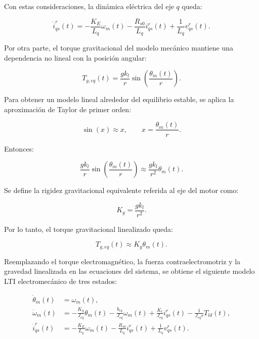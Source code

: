 \documentclass[10pt,a4paper]{article}
\begin{document}
Con estas consideraciones, la dinámica eléctrica del eje $q$ queda:

\begin{equation*}
	\dot{i}_{qs}^r(t)
	=
	-\frac{K_E}{L_q}\omega_m(t)
	-\frac{R_{s0}}{L_q}i_{qs}^r(t)
	+\frac{1}{L_q}v_{qs}^r(t).
\end{equation*}

Por otra parte, el torque gravitacional del modelo mecánico mantiene una dependencia no lineal con la posición angular:

\begin{equation*}
	T_{g,eq}(t)
	=
	\frac{gk_l}{r}
	\sin\left(\frac{\theta_m(t)}{r}\right).
\end{equation*}

Para obtener un modelo lineal alrededor del equilibrio estable, se aplica la aproximación de Taylor de primer orden:

\begin{equation*}
	\sin(x)\approx x,
	\qquad
	x=\frac{\theta_m(t)}{r}.
\end{equation*}

Entonces:

\begin{equation*}
	\frac{gk_l}{r}
	\sin\left(\frac{\theta_m(t)}{r}\right)
	\approx
	\frac{gk_l}{r^2}\theta_m(t).
\end{equation*}

Se define la rigidez gravitacional equivalente referida al eje del motor como:

\begin{equation*}
	K_g=\frac{gk_l}{r^2}.
\end{equation*}

Por lo tanto, el torque gravitacional linealizado queda:

\begin{equation*}
	T_{g,eq}(t)\approx K_g\theta_m(t).
\end{equation*}

Reemplazando el torque electromagnético, la fuerza contraelectromotriz y la gravedad linealizada en las ecuaciones del sistema, se obtiene el siguiente modelo LTI electromecánico de tres estados:

\begin{equation}
	\begin{aligned}
		\dot{\theta}_m(t) &= \omega_m(t),\\[1mm]
		\dot{\omega}_m(t) &=
		-\frac{K_g}{J_{eq}}\theta_m(t)
		-\frac{b_{eq}}{J_{eq}}\omega_m(t)
		+\frac{K_t}{J_{eq}}i_{qs}^r(t)
		-\frac{1}{J_{eq}r}T_{ld}(t),\\[1mm]
		\dot{i}_{qs}^r(t) &=
		-\frac{K_E}{L_q}\omega_m(t)
		-\frac{R_{s0}}{L_q}i_{qs}^r(t)
		+\frac{1}{L_q}v_{qs}^r(t).
	\end{aligned}
	\label{eq:lti_3estados_ecuaciones}
\end{equation}
\end{document}
